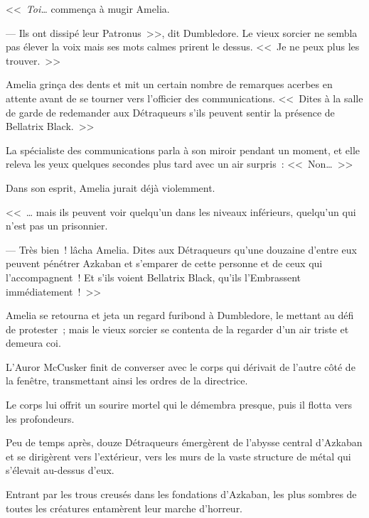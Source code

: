 <<~\emph{Toi…} commença à mugir Amelia.

--- Ils ont dissipé leur Patronus~>>, dit Dumbledore. Le vieux sorcier ne sembla pas élever la voix mais ses mots calmes prirent le dessus. <<~Je ne peux plus les trouver.~>>

Amelia grinça des dents et mit un certain nombre de remarques acerbes en attente avant de se tourner vers l'officier des communications. <<~Dites à la salle de garde de redemander aux Détraqueurs s'ils peuvent sentir la présence de Bellatrix Black.~>>

La spécialiste des communications parla à son miroir pendant un moment, et elle releva les yeux quelques secondes plus tard avec un air surpris~: <<~Non…~>>

Dans son esprit, Amelia jurait déjà violemment.

<<~… mais ils peuvent voir quelqu'un dans les niveaux inférieurs, quelqu'un qui n'est pas un prisonnier.

--- Très bien~! lâcha Amelia. Dites aux Détraqueurs qu'une douzaine d'entre eux peuvent pénétrer Azkaban et s'emparer de cette personne et de ceux qui l'accompagnent~! Et s'ils voient Bellatrix Black, qu'ils l'Embrassent immédiatement~!~>>

Amelia se retourna et jeta un regard furibond à Dumbledore, le mettant au défi de protester~; mais le vieux sorcier se contenta de la regarder d'un air triste et demeura coi.

\later

L'Auror McCusker finit de converser avec le corps qui dérivait de l'autre côté de la fenêtre, transmettant ainsi les ordres de la directrice.

Le corps lui offrit un sourire mortel qui le démembra presque, puis il flotta vers les profondeurs.

Peu de temps après, douze Détraqueurs émergèrent de l'abysse central d'Azkaban et se dirigèrent vers l'extérieur, vers les murs de la vaste structure de métal qui s'élevait au-dessus d'eux.

Entrant par les trous creusés dans les fondations d'Azkaban, les plus sombres de toutes les créatures entamèrent leur marche d'horreur.

